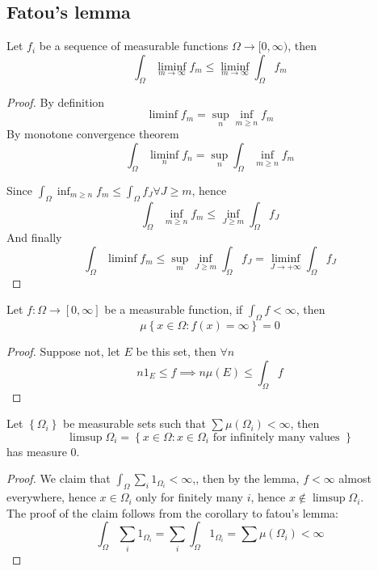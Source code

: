 \documentclass[../main.tex]{subfiles}
\begin{document}
\subsection{Fatou's lemma}
\begin{thm}
Let $f_i$ be a sequence of measurable functions $\Omega \to [ 0, \infty ) $, then
\[ 
\int_{ \Omega }^{  }\liminf_{ m\to \infty } f_m \leq \liminf_{m \to \infty } \int_{ \Omega }^{  }f_m
\]

\end{thm}
\begin{proof}
By definition
\[ 
\liminf f_m = \sup_n \inf_{m \geq n} f_m
\]
By monotone convergence theorem
\[ 
\int_{ \Omega }^{  } \liminf_{n} f_n = \sup_n \int_{ \Omega  }^{  }\inf_{m \geq n} f_m 
\]

Since $ \int_{ \Omega }^{  }\inf_{m \geq n} f_m \leq  \int_{\Omega} f_J \forall J \geq m$, hence
\[ 
\int_{ \Omega  }^{  }\inf_{m \geq n} f_m \leq  \inf_{ J \geq m} \int_{ \Omega }^{  } f_J
\]
And finally
\[ 
\int_{ \Omega }^{  } \liminf f_m \leq \sup_m \inf_{J \geq m} \int_{ \Omega }^{  }f_J = \liminf_{J \to  + \infty} \int_{\Omega} f_J
\]
\end{proof}
\begin{lemma}
Let $f:\Omega\to [ 0, \infty ] $ be a measurable function, if $ \int_{ \Omega }^{  }f < \infty $, then 
\[ 
\mu \left\{ x\in \Omega: f( x) = \infty  \right\} =0
\]

\end{lemma}
\begin{proof}
Suppose not, let $E$ be this set, then $\forall n$ 
\[ 
n 1_E \leq f \implies n \mu( E) \leq  \int_\Omega f
\]

\end{proof}
\begin{exemple}
Let $ \left\{ \Omega_i \right\} $ be measurable sets such that $\sum \mu( \Omega_i) < \infty $, then
\[ 
\limsup \Omega_i = \left\{ x\in \Omega: x\in\Omega_i \text{ for infinitely many values }  \right\} 
\]
has measure 0.
\end{exemple}
\begin{proof}
 We claim that $ \int_{ \Omega }^{  }\sum_i 1_{\Omega_i} < \infty $,, then by the lemma, $f< \infty $ almost everywhere, hence $x\in\Omega_i$ only for finitely many $i$, hence $x \notin \limsup \Omega_i$.\\
 The proof of the claim follows from the corollary to fatou's lemma:
 \[ 
 \int_{ \Omega }^{  }\sum_i 1_{\Omega_i} = \sum_i \int_{ \Omega }^{  }1_{\Omega_i} = \sum \mu( \Omega_i) < \infty 
 \]
 
\end{proof}


	
	

		
\end{document}
